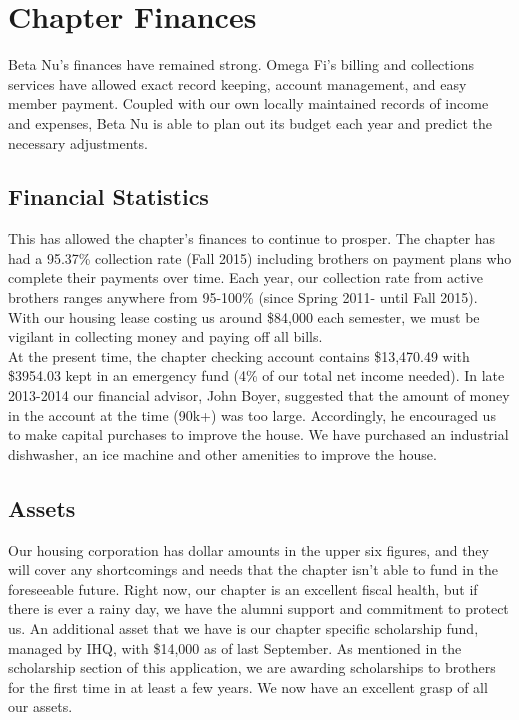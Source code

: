 \chapter{Chapter Finances}

  Beta Nu's finances have remained strong. Omega Fi's billing and collections services have allowed exact record keeping, account management, and easy member payment. Coupled with our own locally maintained records of income and expenses, Beta Nu is able to plan out its budget each year and predict the necessary adjustments.

  \section*{Financial Statistics}
    This has allowed the chapter's finances to continue to prosper. The chapter has had a 95.37\% collection rate (Fall 2015) including brothers on payment plans who complete their payments over time. Each year, our collection rate from active brothers ranges anywhere from 95-100\% (since Spring 2011- until Fall 2015). With our housing lease costing us around \$84,000 each semester, we must be vigilant in collecting money and paying off all bills. \\

    At the present time, the chapter checking account contains \$13,470.49 with \$3954.03 kept in an emergency fund (4\% of our total net income needed). In late 2013-2014 our financial advisor, John Boyer, suggested that the amount of money in the account at the time (90k+) was too large. Accordingly, he encouraged us to make capital purchases to improve the house. We have purchased an industrial dishwasher, an ice machine and other amenities to improve the house.
    
  \section*{Assets}
    Our housing corporation has dollar amounts in the upper six figures, and they will cover any shortcomings and needs that the chapter isn't able to fund in the foreseeable future. Right now, our chapter is an excellent fiscal health, but if there is ever a rainy day, we have the alumni support and commitment to protect us. An additional asset that we have is our chapter specific scholarship fund, managed by IHQ, with \$14,000 as of last September. As mentioned in the scholarship section of this application, we are awarding scholarships to brothers for the first time in at least a few years. We now have an excellent grasp of all our assets.
    

